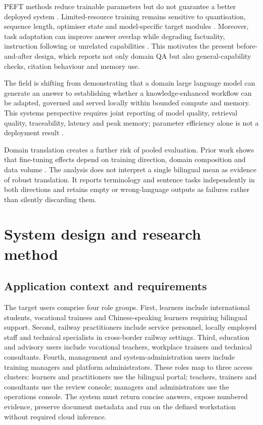 PEFT methods reduce trainable parameters but do not guarantee a better deployed system \citep{ding2023peft,wang2025peft}. Limited-resource training remains sensitive to quantisation, sequence length, optimiser state and model-specific target modules \citep{lv2024full}. Moreover, task adaptation can improve answer overlap while degrading factuality, instruction following or unrelated capabilities \citep{tian2024factuality,barnett2024finetuning}. This motivates the present before-and-after design, which reports not only domain QA but also general-capability checks, citation behaviour and memory use.

The field is shifting from demonstrating that a domain large language model can generate an answer to establishing whether a knowledge-enhanced workflow can be adapted, governed and served locally within bounded compute and memory. This systems perspective requires joint reporting of model quality, retrieval quality, traceability, latency and peak memory; parameter efficiency alone is not a deployment result \citep{ding2023peft,lv2024full,wang2025peft}.

Domain translation creates a further risk of pooled evaluation. Prior work shows that fine-tuning effects depend on training direction, domain composition and data volume \citep{hu2024translation,vieira2024translation,zheng2024translation}. The analysis does not interpret a single bilingual mean as evidence of robust translation. It reports terminology and sentence tasks independently in both directions and retains empty or wrong-language outputs as failures rather than silently discarding them.

\section{System design and research method}

\subsection{Application context and requirements}

The target users comprise four role groups. First, learners include international students, vocational trainees and Chinese-speaking learners requiring bilingual support. Second, railway practitioners include service personnel, locally employed staff and technical specialists in cross-border railway settings. Third, education and advisory users include vocational teachers, workplace trainers and technical consultants. Fourth, management and system-administration users include training managers and platform administrators. These roles map to three access clusters: learners and practitioners use the bilingual portal; teachers, trainers and consultants use the review console; managers and administrators use the operations console. The system must return concise answers, expose numbered evidence, preserve document metadata and run on the defined workstation without required cloud inference.

